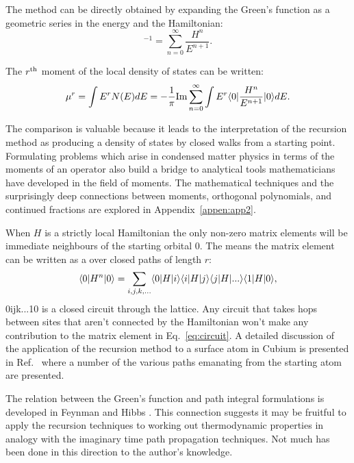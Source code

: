 The method can be directly obtained by expanding the 
Green's function as a geometric series in the energy and the Hamiltonian:
%
\begin{equation}
[E-H]^{-1} = \sum_{n=0}^{\infty} \frac{H^{n}}{E^{n+1}}.
\end{equation}
%

The $r^{\rm th}$ moment of the local density of states can be written:
%
\begin{equation}
\mu^{r} = \int E^{r}N(E)dE = -\frac{1}{\pi}{\rm Im}\sum_{n=0}^{\infty}\int E^{r}\langle 0|\frac{H^{n}}{E^{n+1}}|0\rangle dE.
\end{equation}
%

The comparison is valuable because it leads to the interpretation of 
the recursion method as producing a density of states by closed walks
from a starting point\cite{ducastelle70}. Formulating problems
which arise in condensed matter physics in terms of the moments of
an operator also build a bridge to analytical tools mathematicians
have developed in the field of moments. The mathematical techniques
and the surprisingly deep connections between moments, orthogonal
polynomials, and continued fractions are explored in Appendix~\ref{appen:app2}.

When $H$ is a strictly local Hamiltonian the only non-zero matrix elements 
will be immediate neighbours of the starting orbital $0$. The means
the matrix element can be written as a over closed paths of length $r$:
%
\begin{equation}
\label{eq:circuit}
\langle 0|H^{n}|0 \rangle = \sum_{i,j,k,...}\langle 0|H|i\rangle\langle i|H|j\rangle\langle j|H|...\rangle\langle 1|H|0\rangle,
\end{equation}
%
0ijk...10 is a closed circuit through the lattice. Any circuit that takes hops between sites 
that aren't connected by the Hamiltonian won't make any contribution to the matrix element
in Eq.~\ref{eq:circuit}. A detailed discussion of the application of the recursion method 
to a surface atom in Cubium is presented in Ref.~\cite{haydock75} where a number of the various
paths emanating from the starting atom are presented. 

The relation between the Green's function and path integral formulations is developed
in Feynman and Hibbs \cite{feynmanhibbs64}. This connection suggests it may be fruitful to apply the recursion
techniques to working out thermodynamic properties in analogy with the imaginary time
path propagation techniques. Not much has been done in this direction to the author's 
knowledge.

